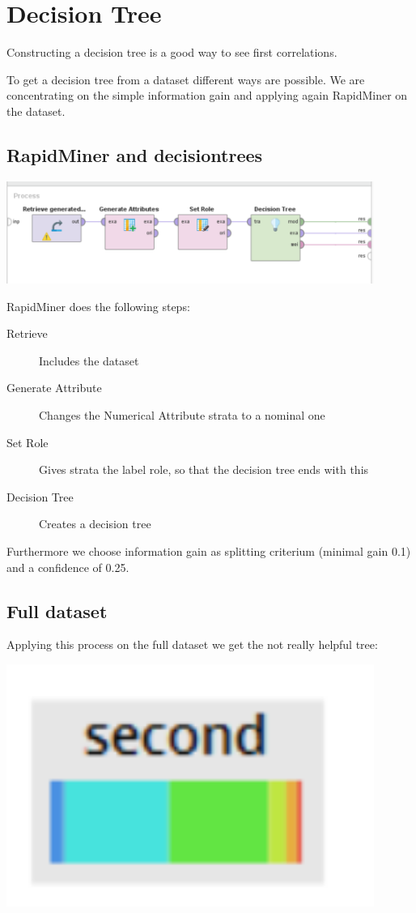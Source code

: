 \section{Decision Tree}

Constructing a decision tree is a good way to see first correlations.

To get a decision tree from a dataset different ways are possible. We are concentrating on the simple information gain and applying again RapidMiner on the dataset. 

\subsection*{RapidMiner and decisiontrees}
\includegraphics[width = 0.9\textwidth]{DecisionTreeRapidModel.PNG}

RapidMiner does the following steps:
\begin{description}
	\item[Retrieve] Includes the dataset
	\item[Generate Attribute] Changes the Numerical Attribute strata to a nominal one
	\item[Set Role] Gives strata the label role, so that the decision tree ends with this
	\item[Decision Tree] Creates a decision tree
\end{description}

Furthermore we choose information gain as splitting criterium (minimal gain 0.1) and a confidence of 0.25.

\subsection*{Full dataset}

Applying this process on the full dataset we get the not really helpful tree:

\includegraphics[width=0.9\textwidth]{DecisionTreeRapidTreeFull.PNG}



